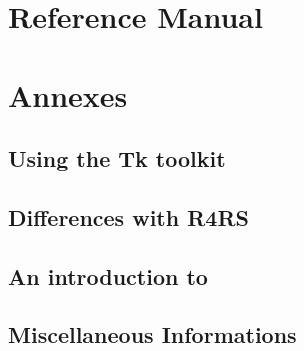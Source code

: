 \documentclass[10pt,a4paper]{book}
\begin{document}
\chead{}
\lfoot{}
\cfoot{\fancyplain{\bf\thepage}{}}
\rfoot{}


%
%
\tableofcontents



%
%
\part{Reference Manual}
\pagestyle{fancy}
\thispagestyle{plain}



%
%
\part{Annexes}
\appendix


\chapter{Using the Tk toolkit}


\chapter{Differences with R4RS}


\chapter{An introduction to {\stklos}}


\chapter{Miscellaneous Informations}




\begin{theindex}
\bigskip

\end{theindex}
\end{document}
